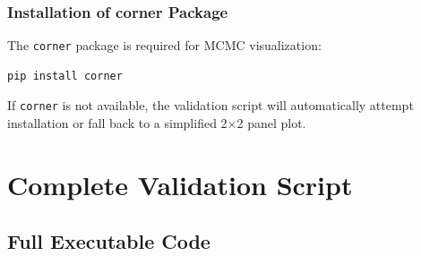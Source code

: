 \documentclass[11pt]{article}
\begin{document}
\subsubsection{Installation of corner Package}

The \texttt{corner} package is required for MCMC visualization:

\begin{lstlisting}[language=bash]
pip install corner
\end{lstlisting}

If \texttt{corner} is not available, the validation script will automatically attempt installation or fall back to a simplified 2×2 panel plot.

\section{Complete Validation Script}

\subsection{Full Executable Code}
\end{document}
